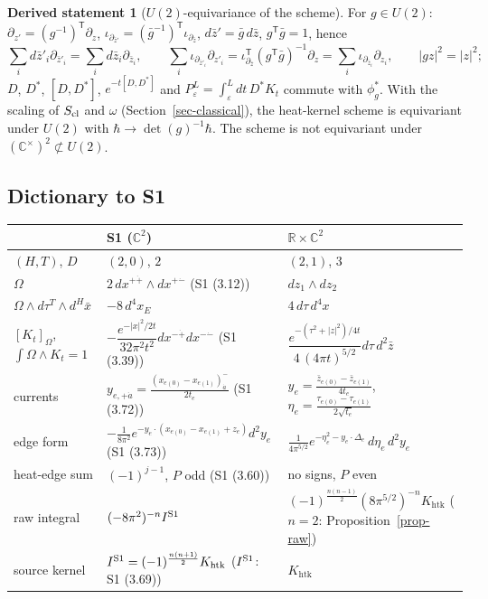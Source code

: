 \documentclass[10pt,a4paper]{article}
\numberwithin{equation}{section}
\theoremstyle{definition}
\newtheorem{dstatement}[theorem]{Derived statement}
\theoremstyle{remark}
\newcommand{\zb}{\bar z}
\newcommand{\htk}{\mathrm{htk}}
\begin{document}
\begin{dstatement}[$U(2)$-equivariance of the scheme]\label{ds-U2}
For $g\in U(2)$: $\partial_{z'}=(g^{-1})^{\mathsf T}\partial_z$, $\iota_{\partial_{\zb'}}=(\bar g^{-1})^{\mathsf T}\iota_{\partial_{\zb}}$, $d\zb'=\bar g\,d\zb$, $g^{\mathsf T}\bar g=1$, hence
\begin{equation}
\textstyle\sum_id\zb'_i\partial_{\zb'_i}=\sum_id\zb_i\partial_{\zb_i},\qquad \sum_i\iota_{\partial_{\zb'_i}}\partial_{z'_i}=\iota_{\partial_{\zb}}^{\mathsf T}(g^{\mathsf T}\bar g)^{-1}\partial_z=\sum_i\iota_{\partial_{\zb_i}}\partial_{z_i},\qquad |gz|^2=|z|^2 ;
\end{equation}
$D$, $D^*$, $[D,D^*]$, $e^{-t[D,D^*]}$ and $P_\varepsilon^L=\int_\varepsilon^Ldt\,D^*K_t$ commute with $\phi_g^*$. With the scaling of $S_{\rm cl}$ and $\omega$ (Section~\ref{sec-classical}), the heat-kernel scheme is equivariant under $U(2)$ with $\hbar\to\det(g)^{-1}\hbar$. The scheme is not equivariant under $(\mathbb C^\times)^2\not\subset U(2)$.
\end{dstatement}

\subsection{Dictionary to S1}\label{sec-dict}

{\footnotesize
\renewcommand{\arraystretch}{1.3}
\begin{longtable}{@{}>{\raggedright\arraybackslash}p{2.6cm}>{\raggedright\arraybackslash}p{6.4cm}>{\raggedright\arraybackslash}p{6.4cm}@{}}
\toprule
 & S1 ($\mathbb C^2$) & $\mathbb R\times\mathbb C^2$\\
\midrule\endhead
$(H,T)$, $D$ & $(2,0)$, $2$ & $(2,1)$, $3$\\
$\Omega$ & $2\,dx^{+\dot+}\wedge dx^{+\dot-}$ (S1 (3.12)) & $dz_1\wedge dz_2$\\
$\Omega\wedge d\tau^T\wedge d^H\bar x$ & $-8\,d^4x_E$ & $4\,d\tau\,d^4x$\\
$[K_t]_\Omega$, $\int\Omega\wedge K_t=1$ & $-\dfrac{e^{-|x|^2/2t}}{32\pi^2t^2}dx^{-\dot+}dx^{-\dot-}$ (S1 (3.39)) & $\dfrac{e^{-(\tau^2+|z|^2)/4t}}{4\,(4\pi t)^{5/2}}d\tau\,d^2\zb$\\
currents & $y_{e,+\dot a}=\frac{(x_{e(0)}-x_{e(1)})^-_{\dot a}}{2t_e}$ (S1 (3.72)) & $y_e=\frac{\zb_{e(0)}-\zb_{e(1)}}{4t_e}$, $\eta_e=\frac{\tau_{e(0)}-\tau_{e(1)}}{2\sqrt{t_e}}$\\
edge form & $-\frac1{8\pi^2}e^{-y_e\cdot(x_{e(0)}-x_{e(1)}+z_e)}d^2y_e$ (S1 (3.73)) & $\frac1{4\pi^{5/2}}e^{-\eta_e^2-y_e\cdot\Delta_e}\,d\eta_e\,d^2y_e$\\
heat-edge sum & $(-1)^{j-1}$, $P$ odd (S1 (3.60)) & no signs, $P$ even\\
raw integral & $(-8\pi^2)^{-n}I^{\rm S1}$ & $(-1)^{\frac{n(n-1)}2}(8\pi^{5/2})^{-n}K_\htk$ ($n=2$: Proposition~\ref{prop-raw})\\
source kernel & $I^{\rm S1}=(-1)^{\frac{n(n+1)}2}K_\htk$ ($I^{\rm S1}$: S1 (3.69)) & $K_\htk$\\
\bottomrule
\end{longtable}}
\end{document}

